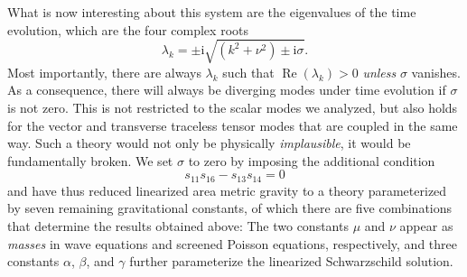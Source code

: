 What is now interesting about this system are the eigenvalues of the time evolution, which are the four complex roots
\begin{equation}
  \lambda_k = \pm \mathrm i \sqrt{(k^2 + \nu^2) \pm \mathrm i\sigma}.
\end{equation}
Most importantly, there are always $\lambda_k$ such that $\operatorname{Re}(\lambda_k)>0$ \emph{unless} $\sigma$ vanishes. As a consequence, there will always be diverging modes under time evolution if $\sigma$ is not zero. This is not restricted to the scalar modes we analyzed, but also holds for the vector and transverse traceless tensor modes that are coupled in the same way. Such a theory would not only be physically \emph{implausible}, it would be fundamentally broken. We set $\sigma$ to zero by imposing the additional condition
\begin{equation}
  s_{11} s_{16} - s_{13} s_{14} = 0
\end{equation}
and have thus reduced linearized area metric gravity to a theory parameterized by seven remaining gravitational constants, of which there are five combinations that determine the results obtained above: The two constants $\mu$ and $\nu$ appear as \emph{masses} in wave equations and screened Poisson equations, respectively, and three constants $\alpha$, $\beta$, and $\gamma$ further parameterize the linearized Schwarzschild solution.

